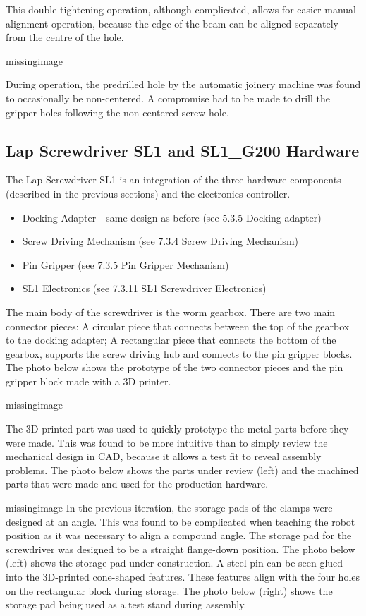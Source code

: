 This double-tightening operation, although complicated, allows for easier manual alignment operation, because the edge of the beam can be aligned separately from the centre of the hole.

missingimage

During operation, the predrilled hole by the automatic joinery machine was found to occasionally be non-centered. A compromise had to be made to drill the gripper holes following the non-centered screw hole.

\subsection{Lap Screwdriver SL1 and SL1\_G200 Hardware}
The Lap Screwdriver SL1 is an integration of the three hardware components (described in the previous sections) and the electronics controller.

\begin{itemize}
    \item Docking Adapter - same design as before (see 5.3.5 Docking adapter)
    \item Screw Driving Mechanism (see 7.3.4 Screw Driving Mechanism)
    \item Pin Gripper (see 7.3.5 Pin Gripper Mechanism)
    \item SL1 Electronics (see 7.3.11 SL1 Screwdriver Electronics)
\end{itemize}

The main body of the screwdriver is the worm gearbox. There are two main connector pieces: A circular piece that connects between the top of the gearbox to the docking adapter; A rectangular piece that connects the bottom of the gearbox, supports the screw driving hub and connects to the pin gripper blocks. The photo below shows the prototype of the two connector pieces and the pin gripper block made with a 3D printer.

missingimage

The 3D-printed part was used to quickly prototype the metal parts before they were made. This was found to be more intuitive than to simply review the mechanical design in CAD, because it allows a test fit to reveal assembly problems. The photo below shows the parts under review (left) and the machined parts that were made and used for the production hardware.

missingimage
In the previous iteration, the storage pads of the clamps were designed at an angle. This was found to be complicated when teaching the robot position as it was necessary to align a compound angle. The storage pad for the screwdriver was designed to be a straight flange-down position. The photo below (left) shows the storage pad under construction. A steel pin can be seen glued into the 3D-printed cone-shaped features. These features align with the four holes on the rectangular block during storage. The photo below (right) shows the storage pad being used as a test stand during assembly. 


